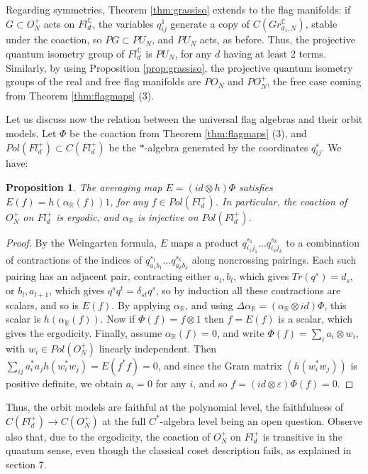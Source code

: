 \documentclass[11pt]{article}
\theoremstyle{plain}
\newtheorem{proposition}[theorem]{Proposition}
\begin{document}
Regarding symmetries, Theorem \ref{thm:grassiso} extends to the flag manifolds: if $G\subset O_N^+$ acts on $Fl^\mathbb C_d$, the variables $q^1_{ij}$ generate a copy of $C(Gr^\mathbb C_{d_1,N})$, stable under the coaction, so $PG\subset PU_N$, and $PU_N$ acts, as before. Thus, the projective quantum isometry group of $Fl^\mathbb C_d$ is $PU_N$, for any $d$ having at least 2 terms. Similarly, by using Proposition \ref{prop:grassiso}, the projective quantum isometry groups of the real and free flag manifolds are $PO_N$ and $PO_N^+$, the free case coming from Theorem \ref{thm:flagmaps} (3).

\bigskip

Let us discuss now the relation between the universal flag algebras and their orbit models. Let $\Phi$ be the coaction from Theorem \ref{thm:flagmaps} (3), and $Pol(Fl^+_d)\subset C(Fl^+_d)$ be the $*$-algebra generated by the coordinates $q^s_{ij}$. We have:

\begin{proposition}
\label{prop:ergodic}
The averaging map $E=(id\otimes h)\Phi$ satisfies $E(f)=h(\alpha_\mathbb R(f))1$, for any $f\in Pol(Fl^+_d)$. In particular, the coaction of $O_N^+$ on $Fl^+_d$ is ergodic, and $\alpha_\mathbb R$ is injective on $Pol(Fl^+_d)$.
\end{proposition}

\begin{proof}
By the Weingarten formula, $E$ maps a product $q^{s_1}_{i_1j_1}\ldots q^{s_k}_{i_kj_k}$ to a combination of contractions of the indices of $q^{s_1}_{a_1b_1}\ldots q^{s_k}_{a_kb_k}$ along noncrossing pairings. Each such pairing has an adjacent pair, contracting either $a_l,b_l$, which gives $Tr(q^s)=d_s$, or $b_l,a_{l+1}$, which gives $q^sq^t=\delta_{st}q^s$, so by induction all these contractions are scalars, and so is $E(f)$. By applying $\alpha_\mathbb R$, and using $\Delta\alpha_\mathbb R=(\alpha_\mathbb R\otimes id)\Phi$, this scalar is $h(\alpha_\mathbb R(f))$. Now if $\Phi(f)=f\otimes1$ then $f=E(f)$ is a scalar, which gives the ergodicity. Finally, assume $\alpha_\mathbb R(f)=0$, and write $\Phi(f)=\sum_ia_i\otimes w_i$, with $w_i\in Pol(O_N^+)$ linearly independent. Then $\sum_{ij}a_i^*a_jh(w_i^*w_j)=E(f^*f)=0$, and since the Gram matrix $(h(w_i^*w_j))$ is positive definite, we obtain $a_i=0$ for any $i$, and so $f=(id\otimes\varepsilon)\Phi(f)=0$.
\end{proof}

Thus, the orbit models are faithful at the polynomial level, the faithfulness of $C(Fl^+_d)\to C(O_N^+)$ at the full $C^*$-algebra level being an open question. Observe also that, due to the ergodicity, the coaction of $O_N^+$ on $Fl^+_d$ is transitive in the quantum sense, even though the classical coset description fails, as explained in section 7.
\end{document}
